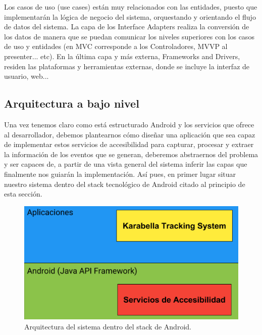 \documentclass[12pt,a4paper,oneside]{book} %
\begin{document}
Los casos de uso (use cases) están muy relacionados con las entidades, puesto que implementarán la lógica de negocio del sistema, orquestando y orientando el flujo de datos del sistema. 
\newline
\newline
La capa de los Interface Adapters realiza la conversión de los datos de manera que se puedan comunicar los niveles superiores con los casos de uso y entidades (en MVC corresponde a los Controladores, MVVP al presenter... etc). 
\newline
\newline
En la última capa y más externa, Frameworks and Drivers, residen las plataformas y herramientas externas, donde se incluye la interfaz de usuario, web... 
\subsection{Arquitectura a bajo nivel}
Una vez tenemos claro como está estructurado Android y los servicios que ofrece al desarrollador, debemos plantearnos cómo diseñar una aplicación que sea capaz de implementar estos servicios de accesibilidad para capturar, procesar y extraer la  información de los eventos que se generan, deberemos abstraernos del problema y ser capaces de, a partir de una vista general del sistema inferir las capas que finalmente nos guiarán la implementación. 
\newline
\newline
Así pues, en primer lugar situar nuestro sistema dentro del stack tecnológico de Android citado al principio de esta sección. 
\newline
\begin{figure}[H]
	\begin{center}
		\includegraphics[scale=0.6]{pictures/architecture/arquitecturaGeneral01.png} 
	\end{center}
	\caption[Arquitectura dentro del android stack]{Arquitectura del sistema dentro del stack de Android.}
\end{figure}
\end{document}
